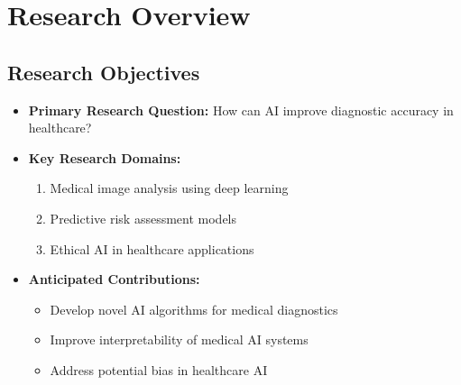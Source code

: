 \chapter{Research Overview}
\section{Research Objectives}
\begin{itemize}
    \item \textbf{Primary Research Question:} How can AI improve diagnostic accuracy in healthcare?
    
    \item \textbf{Key Research Domains:}
    \begin{enumerate}
        \item Medical image analysis using deep learning
        \item Predictive risk assessment models
        \item Ethical AI in healthcare applications
    \end{enumerate}
    
    \item \textbf{Anticipated Contributions:}
    \begin{itemize}
        \item Develop novel AI algorithms for medical diagnostics
        \item Improve interpretability of medical AI systems
        \item Address potential bias in healthcare AI
    \end{itemize}
\end{itemize}